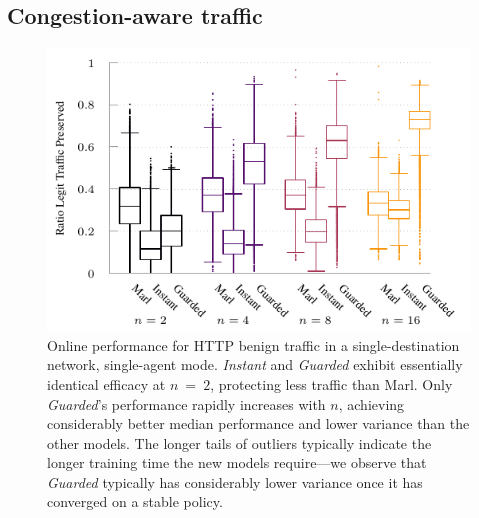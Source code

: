 \documentclass[10pt, times, conference, letterpaper]{IEEEtran}
\begin{document}
\subsection{Congestion-aware traffic}
%	
\begin{figure}
	\centering
	\includegraphics[width=0.95\linewidth]{../plots/tnsm-tcp-box-single}
	
	\caption{
		Online performance for HTTP benign traffic in a single-destination network, single-agent mode.
		\emph{Instant} and \emph{Guarded} exhibit essentially identical efficacy at $n~=~2$, protecting less traffic than Marl.
		Only \emph{Guarded}'s performance rapidly increases with $n$, achieving considerably better median performance and lower variance than the other models.
		The longer tails of outliers typically indicate the longer training time the new models require---we observe that \emph{Guarded} typically has considerably lower variance once it has converged on a stable policy.
		\label{fig:tcp-tree-box}
	}
\end{figure}
%	
\end{document}

